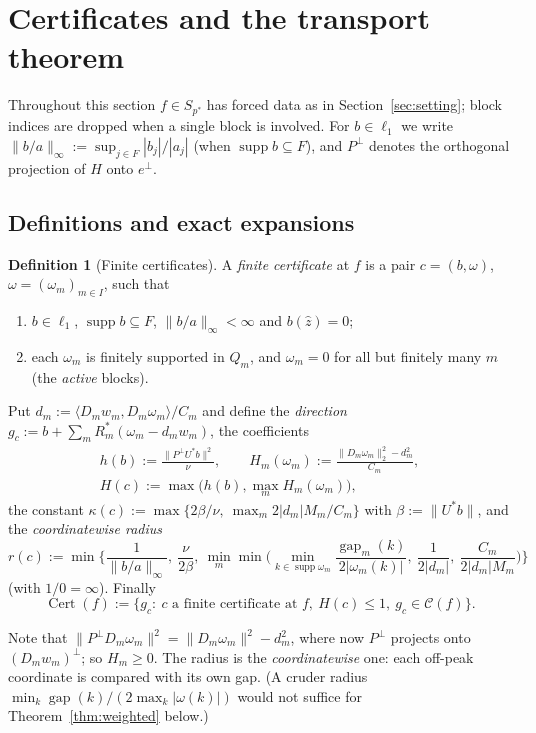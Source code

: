 \documentclass[10pt]{amsart}
\theoremstyle{definition}
\newtheorem{definition}[theorem]{Definition}
\theoremstyle{remark}
\newcommand{\supp}{\operatorname{supp}}
\newcommand{\Cset}{\mathcal C}
\newcommand{\Cert}{\operatorname{Cert}}
\newcommand{\gap}{\operatorname{gap}}
\newcommand{\zh}{\hat z}
\newcommand{\ip}[2]{\langle #1,#2\rangle}
\begin{document}
\section{Certificates and the transport theorem}\label{sec:certificates}

Throughout this section $f\in S_{p^*}$ has forced data as in
Section~\ref{sec:setting}; block indices are dropped when a single block is
involved.  For $b\in\ell_1$ we write $\|b/a\|_\infty:=\sup_{j\in F}|b_j|/|a_j|$
(when $\supp b\subseteq F$), and $P^\perp$ denotes the orthogonal projection
of $H$ onto $e^\perp$.

\subsection{Definitions and exact expansions}

\begin{definition}[Finite certificates]\label{def:certificate}
A \emph{finite certificate} at $f$ is a pair $c=(b,\omega)$,
$\omega=(\omega_m)_{m\in I}$, such that
\begin{enumerate}
\item[(C1)] $b\in\ell_1$, $\supp b\subseteq F$, $\|b/a\|_\infty<\infty$ and
$b(\zh)=0$;
\item[(C2)] each $\omega_m$ is finitely supported in $Q_m$, and
$\omega_m=0$ for all but finitely many $m$ (the \emph{active} blocks).
\end{enumerate}
Put $d_m:=\ip{D_mw_m}{D_m\omega_m}/C_m$ and define the \emph{direction}
$g_c:=b+\sum_mR_m^*(\omega_m-d_mw_m)$, the coefficients
\begin{gather*}
 h(b):=\frac{\|P^\perp U^*b\|^2}{\nu},\qquad
 H_m(\omega_m):=\frac{\|D_m\omega_m\|_2^2-d_m^2}{C_m},\\
 H(c):=\max\big(h(b),\max_mH_m(\omega_m)\big),
\end{gather*}
the constant $\kappa(c):=\max\{2\beta/\nu,\ \max_m2|d_m|M_m/C_m\}$ with
$\beta:=\|U^*b\|$, and the \emph{coordinatewise radius}
\[
 r(c):=\min\Big\{\frac1{\|b/a\|_\infty},\ \frac\nu{2\beta},\
 \min_m\min\Big(\min_{k\in\supp\omega_m}\frac{\gap_m(k)}{2|\omega_m(k)|},\
 \frac1{2|d_m|},\ \frac{C_m}{2|d_m|M_m}\Big)\Big\}
\]
(with $1/0=\infty$).  Finally
\[
 \Cert(f):=\{g_c:\ c\text{ a finite certificate at }f,\ H(c)\le1,\ g_c\in\Cset(f)\}.
\]
\end{definition}

Note that $\|P^\perp D_m\omega_m\|^2=\|D_m\omega_m\|^2-d_m^2$, where now
$P^\perp$ projects onto $(D_mw_m)^\perp$; so $H_m\ge0$.  The radius is the
\emph{coordinatewise} one: each off-peak coordinate is compared with its own
gap.  (A cruder radius $\min_k\gap(k)/(2\max_k|\omega(k)|)$ would not suffice
for Theorem~\ref{thm:weighted} below.)
\end{document}
